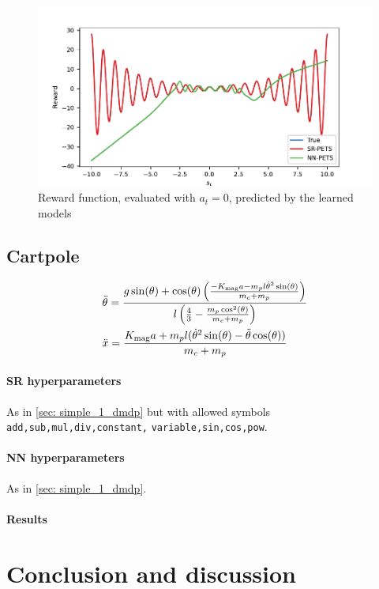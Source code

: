 \documentclass[11pt]{article}
\begin{document}
\begin{figure}
	\centering
	\includegraphics{simple1dmdp_pets.pdf}
	\caption{Reward function, evaluated with $a_t=0$, predicted by the learned models}
	\label{fig: simple_1dmdp}
\end{figure}

\subsection{Cartpole}

\begin{align}
	&\ddot{\theta} = \frac{g\sin(\theta) + \cos(\theta)\left(\frac{-K_{\rm mag} a - m_p l \dot{\theta}^2\sin(\theta)}{m_c + m_p}\right)}{l\left(\frac{4}{3} - \frac{m_p\cos^2(\theta)}{m_c+m_p}\right)}\\
	& \ddot{x} = \frac{K_{\rm mag} a + m_pl(\dot{\theta}^2\sin(\theta) - \ddot{\theta}\cos(\theta))}{m_c + m_p}
\end{align}


\paragraph{SR hyperparameters} As in \ref{sec: simple_1_dmdp} but with allowed symbols \texttt{add,sub,mul,div,constant,} \texttt{variable,sin,cos,pow}.

\paragraph{NN hyperparameters} As in \ref{sec: simple_1_dmdp}.

\paragraph{Results}


\section{Conclusion and discussion}
\end{document}
